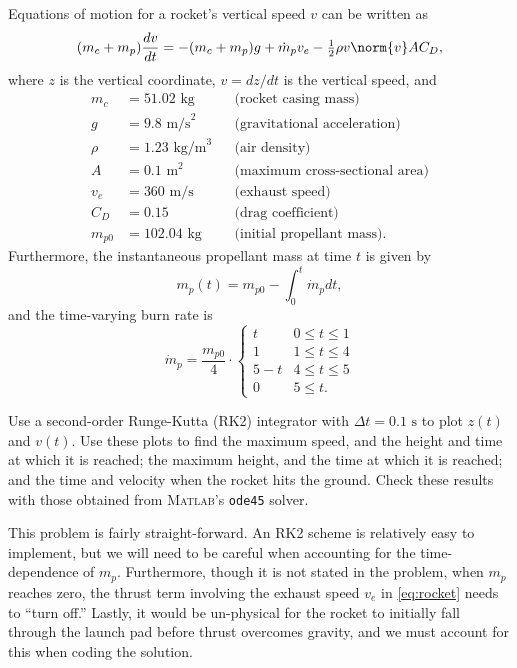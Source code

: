 \documentclass[12pt]{article}
\begin{document}
Equations of motion for a rocket's vertical speed $v$ can be written as
\begin{equation}
(m_c + m_p) \frac{dv}{dt} = -(m_c + m_p) g + \dot{m}_p v_e - \tfrac{1}{2} \rho v \norm{v} A C_D
,
\label{eq:rocket}
\end{equation}
where $z$ is the vertical coordinate, $v = dz/dt$ is the vertical speed, and
\begin{equation*}
\begin{aligned}
m_c &= 51.02 \text{ kg} &&\text{(rocket casing mass)} \\
g &= 9.8 \text{ m/s}^2 &&\text{(gravitational acceleration)} \\
\rho &= 1.23 \text{ kg/m}^3 &&\text{(air density)} \\
A &= 0.1 \text{ m}^2 &&\text{(maximum cross-sectional area)} \\
v_e &= 360 \text{ m/s} &&\text{(exhaust speed)} \\
C_D &= 0.15 &&\text{(drag coefficient)} \\
m_{p0} &= 102.04 \text{ kg} &&\text{(initial propellant mass)}
.
\end{aligned}
\end{equation*}
Furthermore, the instantaneous propellant mass at time $t$ is given by
\begin{equation}
m_p(t) = m_{p0} - \int_0^t \dot{m}_p dt
,
\end{equation}
and the time-varying burn rate is
\begin{equation}
\dot{m}_p =
\frac{m_{p0}}{4}
\cdot
\begin{cases}
t     & 0 \le t \le 1 \\
1     & 1 \le t \le 4 \\
5 - t & 4 \le t \le 5 \\
0     & 5 \le t
.
\end{cases}
\end{equation}

Use a second-order Runge-Kutta (RK2) integrator with $\Delta t = 0.1 \text{ s}$ to plot $z(t)$ and $v(t)$. Use these plots to find the maximum speed, and the height and time at which it is reached; the maximum height, and the time at which it is reached; and the time and velocity when the rocket hits the ground. Check these results with those obtained from \textsc{Matlab}'s \lstinline|ode45| solver.

This problem is fairly straight-forward. An RK2 scheme is relatively easy to implement, but we will need to be careful when accounting for the time-dependence of $m_p$. Furthermore, though it is not stated in the problem, when $m_p$ reaches zero, the thrust term involving the exhaust speed $v_e$ in \eqref{eq:rocket} needs to ``turn off.'' Lastly, it would be un-physical for the rocket to initially fall through the launch pad before thrust overcomes gravity, and we must account for this when coding the solution.
\end{document}
